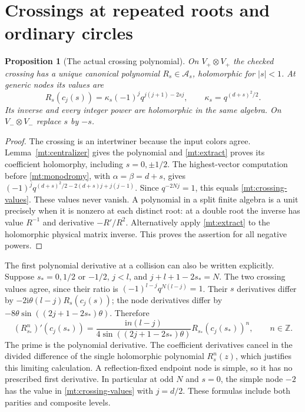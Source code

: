 \documentclass[11pt]{article}
\numberwithin{equation}{section}
\newtheorem{proposition}[theorem]{Proposition}
\theoremstyle{definition}\newtheorem{definition}[theorem]{Definition}
\theoremstyle{remark}\newtheorem{remark}[theorem]{Remark}
\newcommand{\ii}{\mathrm i}
\newcommand{\Acal}{\mathcal A}
\begin{document}
\section{Crossings at repeated roots and ordinary circles}
\begin{proposition}[The actual crossing polynomial]\label{mt:crossing}
On $V_+\otimes V_+$ the checked crossing has a unique canonical
polynomial $R_s\in\Acal_s$, holomorphic for $|s|<1$. At generic
nodes its values are
\begin{equation}\label{mt:crossing-values}
 R_s(c_j(s))=\kappa_s(-1)^jq^{j(j+1)-2sj},\qquad
 \kappa_s=q^{(d+s)^2/2}.
\end{equation}
Its inverse and every integer power are holomorphic in the same
algebra. On $V_-\otimes V_-$ replace $s$ by $-s$.
\end{proposition}
\begin{proof}
The crossing is an intertwiner because the input colors agree.
Lemma~\ref{mt:centralizer} gives the polynomial and
\eqref{mt:extract} proves its coefficient holomorphy, including
$s=0,\pm1/2$. The highest-vector computation before
\eqref{mt:monodromy}, with $\alpha=\beta=d+s$, gives
$(-1)^jq^{(d+s)^2/2-2(d+s)j+j(j-1)}$.
Since $q^{-2Nj}=1$, this equals \eqref{mt:crossing-values}.
These values never vanish. A polynomial in a split finite algebra
is a unit precisely when it is nonzero at each distinct root: at a
double root the inverse has value $R^{-1}$ and derivative $-R'/R^2$.
Alternatively apply \eqref{mt:extract} to the holomorphic physical
matrix inverse. This proves the assertion for all negative powers.
\end{proof}

The first polynomial derivative at a collision can also be written explicitly. Suppose $s_*=0,1/2$ or
$-1/2$, $j<l$, and $j+l+1-2s_*=N$. The two crossing values agree,
since their ratio is $(-1)^{l-j}q^{N(l-j)}=1$.
Their $s$ derivatives differ by $-2\ii\theta(l-j)R_s(c_j(s))$;
the node derivatives differ by
$-8\theta\sin((2j+1-2s_*)\theta)$. Therefore
\begin{equation}\label{mt:crossing-normal}
 (R_{s_*}^n)'(c_j(s_*))=
 \frac{\ii n(l-j)}{4\sin((2j+1-2s_*)\theta)}
                         R_{s_*}(c_j(s_*))^n,
 \qquad n\in\mathbb Z.
\end{equation}
The prime is the polynomial derivative. The coefficient derivatives
cancel in the divided difference of the single holomorphic
polynomial $R_s^n(z)$, which justifies this limiting calculation.
A reflection-fixed endpoint node is simple, so it has no prescribed
first derivative. In particular at odd $N$ and $s=0$, the simple node $-2$
has the value in \eqref{mt:crossing-values} with $j=d/2$.
These formulas include both parities and composite levels.
\end{document}
